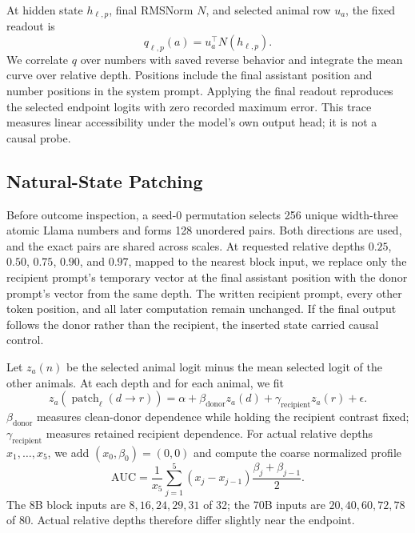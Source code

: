 \documentclass[letterpaper]{article}
\begin{document}
At hidden state $h_{\ell,p}$, final RMSNorm $N$, and selected animal row $u_a$,
the fixed readout is
\begin{equation}
q_{\ell,p}(a)=u_a^\top N(h_{\ell,p}).
\end{equation}
We correlate $q$ over numbers with saved reverse behavior and integrate the mean
curve over relative depth. Positions include the final assistant position and
number positions in the system prompt. Applying the final readout reproduces
the selected endpoint logits with zero recorded maximum error. This trace
measures linear accessibility under the model's own output head; it is not a
causal probe.

\subsection{Natural-State Patching}

Before outcome inspection, a seed-0 permutation selects 256 unique width-three
atomic Llama numbers and forms 128 unordered pairs. Both directions are used,
and the exact pairs are shared across scales. At requested relative depths
$0.25$, $0.50$, $0.75$, $0.90$, and $0.97$, mapped to the nearest block input, we replace
only the recipient prompt's temporary vector at the final assistant position
with the donor prompt's vector from the same depth. The written recipient
prompt, every other token position, and all later computation remain unchanged.
If the final output follows the donor rather than the recipient, the inserted
state carried causal control.

Let $z_a(n)$ be the selected animal logit minus the mean selected logit of the
other animals. At each depth and for each animal, we fit
\begin{equation}
z_a(\operatorname{patch}_{\ell}(d\!\rightarrow\!r))=
\alpha+\beta_{\mathrm{donor}}z_a(d)
+\gamma_{\mathrm{recipient}}z_a(r)+\epsilon.
\end{equation}
$\beta_{\mathrm{donor}}$ measures clean-donor dependence while holding the
recipient contrast fixed; $\gamma_{\mathrm{recipient}}$ measures retained
recipient dependence. For actual relative depths $x_1,\ldots,x_5$, we add
$(x_0,\beta_0)=(0,0)$ and compute the coarse normalized profile
\begin{equation}
\mathrm{AUC}=\frac{1}{x_5}\sum_{j=1}^{5}
(x_j-x_{j-1})\frac{\beta_j+\beta_{j-1}}{2}.
\end{equation}
The 8B block inputs are $8,16,24,29,31$ of 32; the 70B inputs are
$20,40,60,72,78$ of 80. Actual relative depths therefore differ slightly near
the endpoint.
\end{document}
